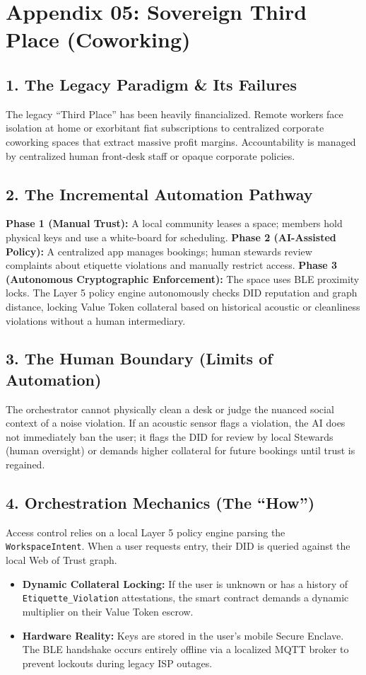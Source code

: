 \chapter*{Appendix 05: Sovereign Third Place (Coworking)}

\section*{1. The Legacy Paradigm \& Its Failures}
The legacy ``Third Place'' has been heavily financialized. Remote workers face isolation at home or exorbitant fiat subscriptions to centralized corporate coworking spaces that extract massive profit margins. Accountability is managed by centralized human front-desk staff or opaque corporate policies.

\section*{2. The Incremental Automation Pathway}
\textbf{Phase 1 (Manual Trust):} A local community leases a space; members hold physical keys and use a white-board for scheduling.
\textbf{Phase 2 (AI-Assisted Policy):} A centralized app manages bookings; human stewards review complaints about etiquette violations and manually restrict access.
\textbf{Phase 3 (Autonomous Cryptographic Enforcement):} The space uses BLE proximity locks. The Layer 5 policy engine autonomously checks DID reputation and graph distance, locking Value Token collateral based on historical acoustic or cleanliness violations without a human intermediary.

\section*{3. The Human Boundary (Limits of Automation)}
The orchestrator cannot physically clean a desk or judge the nuanced social context of a noise violation. If an acoustic sensor flags a violation, the AI does not immediately ban the user; it flags the DID for review by local Stewards (human oversight) or demands higher collateral for future bookings until trust is regained.

\section*{4. Orchestration Mechanics (The ``How'')}
Access control relies on a local Layer 5 policy engine parsing the \texttt{WorkspaceIntent}. When a user requests entry, their DID is queried against the local Web of Trust graph. 
\begin{itemize}
    \item \textbf{Dynamic Collateral Locking:} If the user is unknown or has a history of \texttt{Etiquette\_Violation} attestations, the smart contract demands a dynamic multiplier on their Value Token escrow.
    \item \textbf{Hardware Reality:} Keys are stored in the user's mobile Secure Enclave. The BLE handshake occurs entirely offline via a localized MQTT broker to prevent lockouts during legacy ISP outages.
\end{itemize}
